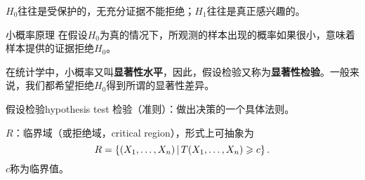 $H_0$往往是受保护的，无充分证据不能拒绝；$H_1$往往是真正感兴趣的。
\begin{theorem}{小概率原理}{}
	在假设$H_0$为真的情况下，所观测的样本出现的概率如果很小，意味着样本提供的证据拒绝$H_0$。
\end{theorem}
在统计学中，小概率又叫\textbf{显著性水平}，因此，假设检验又称为\textbf{显著性检验}。一般来说，我们都希望拒绝$H_0$得到所谓的显著性差异。
\begin{definition}{假设检验}{hypothesis test}
	检验（准则）：做出决策的一个具体法则。

	$R$：临界域（或拒绝域，critical region），形式上可抽象为
	\[
		R=\left\{(X_1,\ldots,X_n)\,\middle\vert\,T(X_1,\ldots,X_n)\geqslant c\right\}.
	\]
	$c$称为临界值。
\end{definition}


